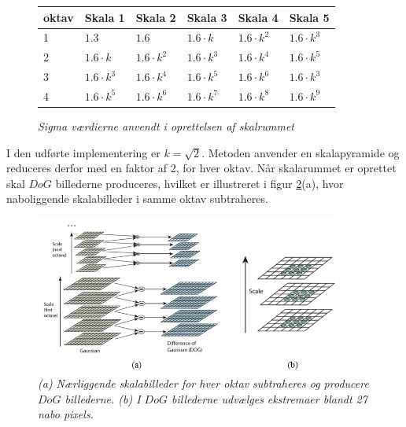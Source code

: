 \begin{figure}[H]
    \centering
    \begin{center}    
    \begin{tabular}{ | l | l | l | l | l | l | }
    \hline
    oktav & Skala 1 & Skala 2 & Skala 3 & Skala 4 & Skala 5 \\ \hline
    1 & $1.3$ & $1.6$ & $1.6 \cdot k$ & $1.6 \cdot k^2$ & $1.6 \cdot k^3$ \\ \hline
  	2 & $1.6 \cdot k$ & $1.6 \cdot k^2$ & $1.6 \cdot k^3$ & $1.6 \cdot k^4$ & $1.6 \cdot k^5$ \\ \hline
  	3 & $1.6 \cdot k^3$ & $1.6 \cdot k^4$ & $1.6 \cdot k^5$ & $1.6 \cdot k^6$ & $1.6 \cdot k^3$ \\ \hline
  	4 & $1.6 \cdot k^5$ & $1.6 \cdot k^6$ & $1.6 \cdot k^7$ & $1.6 \cdot k^8$ & $1.6 \cdot k^9$ \\ \hline
    \end{tabular}       
    \caption{{\footnotesize \textit{Sigma værdierne anvendt i oprettelsen af skalrummet}}}
    \label{fig:secderivfiltersize}
     \end{center}
     \vspace{-2.5em}
  \end{figure} \noindent
I den udførte implementering er $k=\sqrt{2}$.  Metoden anvender en skalapyramide og reduceres derfor med en faktor af 2, for hver oktav. Når skalarummet er oprettet skal $DoG$ billederne produceres, hvilket er illustreret i figur \ref{fig:1difference}(a), hvor naboliggende skalabilleder i samme oktav subtraheres. 
\begin{figure}[H]
    \centering
    \includegraphics[width=0.90\textwidth]{fig/30.png}
     \vspace{-1em}
    \begin{center}    
       \caption{{\footnotesize \textit{(a) Nærliggende skalabilleder for hver oktav subtraheres og producere $DoG$ billederne. (b) I  $DoG$ billederne udvælges ekstremaer blandt 27 nabo pixels.}}}
    \label{fig:1difference}
     \end{center}
     \vspace{-2.5em}
  \end{figure} \noindent    
